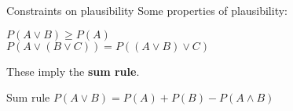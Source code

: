 \documentclass{beamer}
\begin{document}
\begin{frame}[t]{Constraints on plausibility}
Some properties of plausibility:\vspace{20pt}

$P(A \vee B) \geq P(A)$\\
$P(A \vee (B \vee C)) = P((A \vee B) \vee C)$\vspace{20pt}

These imply the {\bf sum rule}.
\end{frame}

\begin{frame}[t]{Sum rule}
$P(A \vee B) = P(A) + P(B) - P(A \wedge B)$
\end{frame}
\end{document}
